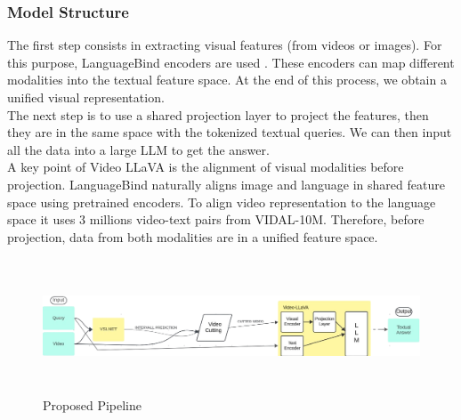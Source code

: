 \documentclass[conference]{IEEEtran}
\begin{document}
\subsubsection{Model Structure}
The first step consists in extracting visual features (from videos or images). For this purpose, LanguageBind encoders are used \cite{b3}. These encoders can map different modalities into the textual feature space. At the end of this process, we obtain a unified visual representation.\\ 
The next step is to use a shared projection layer to project the features, then they are in the same space with the tokenized textual queries. We can then input all the data into a large LLM to get the answer.\\
A key point of Video LLaVA is the alignment of visual modalities before projection. LanguageBind naturally aligns image and language in shared feature space using pretrained encoders. To align video representation to the language space it uses 3 millions video-text pairs from VIDAL-10M\cite{b3}. Therefore, before projection, data from both modalities are in a unified feature space.

\begin{figure}
  \includegraphics[width=\textwidth,height=4cm]{ProposedPipeLine-removebg-preview.png}
  \caption{Proposed Pipeline}
  \label{fig:fullPipeline}
\end{figure}
\end{document}
